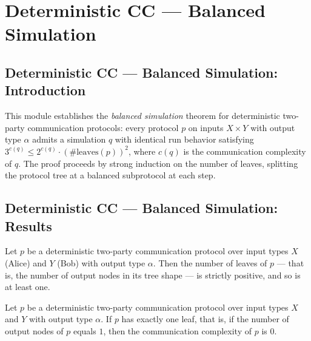 \section{Deterministic CC --- Balanced Simulation}
\subsection*{Deterministic CC --- Balanced Simulation: Introduction}

This module establishes the \emph{balanced simulation} theorem for deterministic two-party
communication protocols: every protocol $p$ on inputs $X \times Y$ with output type $\alpha$
admits a simulation $q$ with identical run behavior satisfying
$3^{c(q)} \le 2^{c(q)} \cdot (\#\mathrm{leaves}(p))^{2}$,
where $c(q)$ is the communication complexity of $q$.
The proof proceeds by strong induction on the number of leaves,
splitting the protocol tree at a balanced subprotocol at each step.

\subsection*{Deterministic CC --- Balanced Simulation: Results}

\begin{lemma}
\label{CommunicationComplexity.Deterministic.Protocol.numLeaves_pos}
\leanok
{}
Let $p$ be a deterministic two-party communication protocol over input types $X$ (Alice)
and $Y$ (Bob) with output type $\alpha$. Then the number of leaves of $p$ — that is, the
number of output nodes in its tree shape — is strictly positive, and so is at least one.
\end{lemma}

\begin{lemma}
\label{CommunicationComplexity.Deterministic.Protocol.complexity_eq_zero_of_numLeaves_eq_one}
\leanok
{}
Let $p$ be a deterministic two-party communication protocol over input types $X$ and $Y$
with output type $\alpha$. If $p$ has exactly one leaf, that is, if the number of output
nodes of $p$ equals $1$, then the communication complexity of $p$ is $0$.
\end{lemma}

